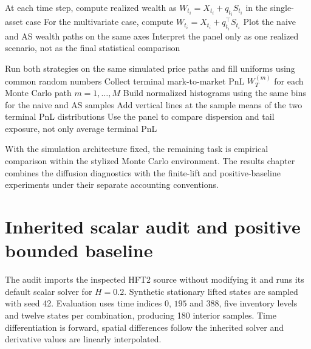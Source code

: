 \begin{algorithm}[H]
\caption{Panel (c): Mark-to-market PnL}
\DontPrintSemicolon
{}
At each time step, compute realized wealth as $W_{t_i}=X_{t_i}+q_{t_i}S_{t_i}$ in the single-asset case\;
For the multivariate case, compute $W_{t_i}=X_{t_i}+q_{t_i}^{\top}S_{t_i}$\;
Plot the naive and AS wealth paths on the same axes\;
Interpret the panel only as one realized scenario, not as the final statistical comparison\;
\end{algorithm}

\begin{algorithm}[H]
\caption{Panel (d): Terminal PnL distribution}
\DontPrintSemicolon
{}
Run both strategies on the same simulated price paths and fill uniforms using common random numbers\;
Collect terminal mark-to-market PnL $W_T^{(m)}$ for each Monte Carlo path $m=1,\ldots,M$\;
Build normalized histograms using the same bins for the naive and AS samples\;
Add vertical lines at the sample means of the two terminal PnL distributions\;
Use the panel to compare dispersion and tail exposure, not only average terminal PnL\;
\end{algorithm}

With the simulation architecture fixed, the remaining task is empirical comparison within the stylized Monte Carlo environment. The results chapter combines the diffusion diagnostics with the finite-lift and positive-baseline experiments under their separate accounting conventions.
\section{Inherited scalar audit and positive bounded baseline}


The audit imports the inspected HFT2 source without modifying it and runs its default scalar solver for $H=0.2$. Synthetic stationary lifted states are sampled with seed 42. Evaluation uses time indices $0$, $195$ and $388$, five inventory levels and twelve states per combination, producing 180 interior samples. Time differentiation is forward, spatial differences follow the inherited solver and derivative values are linearly interpolated.

